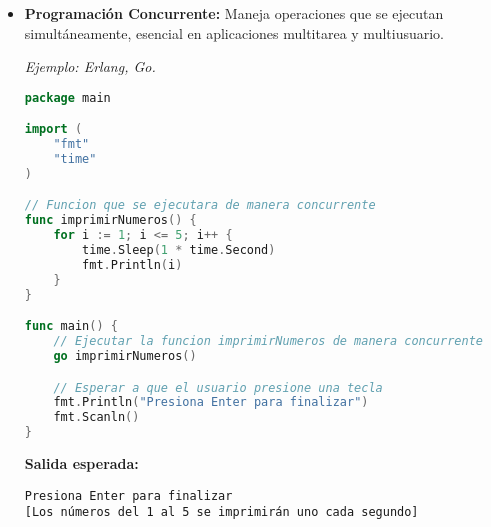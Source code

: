 \documentclass{report}
\begin{document}
\begin{itemize}
\begin{minipage}{\linewidth}
\textbf{Salida esperada:}
\begin{verbatim}
[Lista de nombres de empleados mayores de 30 años]
\end{verbatim}
\end{minipage} %

\item \textbf{Programación Concurrente:} Maneja operaciones que se ejecutan simultáneamente, esencial en aplicaciones multitarea y multiusuario. 

\textit{Ejemplo: Erlang, Go.}

\begin{minipage}{\linewidth} %
\begin{lstlisting}[language=Go, caption=Ejemplo de Programacion Concurrente en Go]
package main

import (
    "fmt"
    "time"
)

// Funcion que se ejecutara de manera concurrente
func imprimirNumeros() {
    for i := 1; i <= 5; i++ {
        time.Sleep(1 * time.Second)
        fmt.Println(i)
    }
}

func main() {
    // Ejecutar la funcion imprimirNumeros de manera concurrente
    go imprimirNumeros()

    // Esperar a que el usuario presione una tecla
    fmt.Println("Presiona Enter para finalizar")
    fmt.Scanln()
}
\end{lstlisting}

\textbf{Salida esperada:}
\begin{verbatim}
Presiona Enter para finalizar
[Los números del 1 al 5 se imprimirán uno cada segundo]
\end{verbatim}
\end{minipage} %

\end{itemize}
\end{document}
